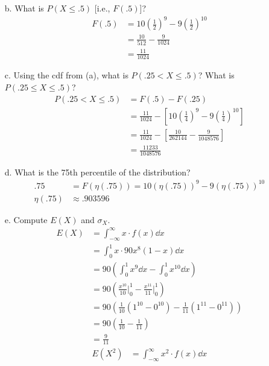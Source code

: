\documentclass[letterpaper,12pt]{article}
\begin{document}
\begin{enumerate}
\begin{enumerate}
      \item[b.]
        What is $P(X \le .5)$ [i.e., $F(.5)$]?
        \begin{align*}
          F(.5) &= 10\left(\frac{1}{2}\right)^9 - 9\left(\frac{1}{2}\right)^{10} \\
          &= \frac{10}{512} - \frac{9}{1024} \\
          &= \frac{11}{1024}
        \end{align*}
      \item[c.]
        Using the cdf from (a), what is $P(.25 < X \le .5)$? What is $P(.25 \le X \le .5)$?
        \begin{align*}
          P(.25 < X \le .5) &= F(.5) - F(.25) \\
          &= \frac{11}{1024} - \left[10\left(\frac{1}{4}\right)^9 - 9\left(\frac{1}{4}\right)^{10}\right] \\
          &= \frac{11}{1024} - \left[\frac{10}{262144} - \frac{9}{1048576}\right] \\
          &= \frac{11233}{1048576}
        \end{align*}
      \item[d.]
        What is the 75th percentile of the distribution?
        \begin{align*}
          .75 &= F(\eta(.75)) = 10(\eta(.75))^9 - 9(\eta(.75))^{10} \\
          \eta(.75) &\approx .903596
        \end{align*}
      \item[e.]
        Compute $E(X)$ and $\sigma_X$.
        \begin{align*}
          E(X) &= \int_{-\infty}^{\infty} x \cdot f(x) \dd{x} \\
          &= \int_{0}^{1} x \cdot 90x^8(1 - x) \dd{x} \\
          &= 90 \left(\int_{0}^{1} x^9 \dd{x} - \int_{0}^{1} x^{10} \dd{x}\right) \\
          &= 90 \left(\frac{x^{10}}{10} \bigg\rvert_{0}^{1} - \frac{x^{11}}{11} \bigg\rvert_{0}^{1}\right) \\
          &= 90 \left(\frac{1}{10}(1^{10} - 0^{10}) - \frac{1}{11}(1^{11} - 0^{11})\right) \\
          &= 90 \left(\frac{1}{10} - \frac{1}{11}\right) \\
          &= \frac{9}{11}
        \end{align*}
        \begin{align*}
          E(X^2) &= \int_{-\infty}^{\infty} x^2 \cdot f(x) \dd{x} \\

\end{align*}
\end{enumerate}
\end{enumerate}
\end{document}
